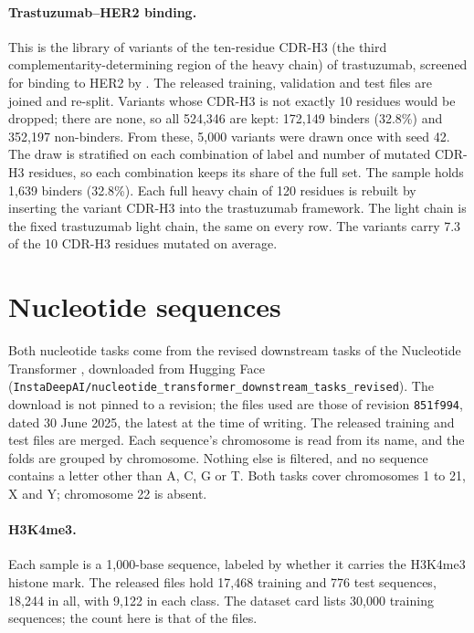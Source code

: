 \paragraph{Trastuzumab--HER2 binding.} This is the library of variants of the ten-residue CDR-H3 (the third complementarity-determining region of the heavy chain) of trastuzumab, screened for binding to HER2 by \citet{Chinery2024}. The released training, validation and test files are joined and re-split. Variants whose CDR-H3 is not exactly 10 residues would be dropped; there are none, so all 524,346 are kept: 172,149 binders (32.8\%) and 352,197 non-binders. From these, 5,000 variants were drawn once with seed 42. The draw is stratified on each combination of label and number of mutated CDR-H3 residues, so each combination keeps its share of the full set. The sample holds 1,639 binders (32.8\%). Each full heavy chain of 120 residues is rebuilt by inserting the variant CDR-H3 into the trastuzumab framework. The light chain is the fixed trastuzumab light chain, the same on every row. The variants carry 7.3 of the 10 CDR-H3 residues mutated on average.

\section{Nucleotide sequences}\label{app:datasets:nucleotides}

Both nucleotide tasks come from the revised downstream tasks of the Nucleotide Transformer \citep{DallaTorre2025}, downloaded from Hugging Face (\nolinkurl{InstaDeepAI/nucleotide_transformer_downstream_tasks_revised}). The download is not pinned to a revision; the files used are those of revision \texttt{851f994}, dated 30 June 2025, the latest at the time of writing. The released training and test files are merged. Each sequence's chromosome is read from its name, and the folds are grouped by chromosome. Nothing else is filtered, and no sequence contains a letter other than A, C, G or T. Both tasks cover chromosomes 1 to 21, X and Y; chromosome 22 is absent.

\paragraph{H3K4me3.} Each sample is a 1,000-base sequence, labeled by whether it carries the H3K4me3 histone mark. The released files hold 17,468 training and 776 test sequences, 18,244 in all, with 9,122 in each class. The dataset card lists 30,000 training sequences; the count here is that of the files.


